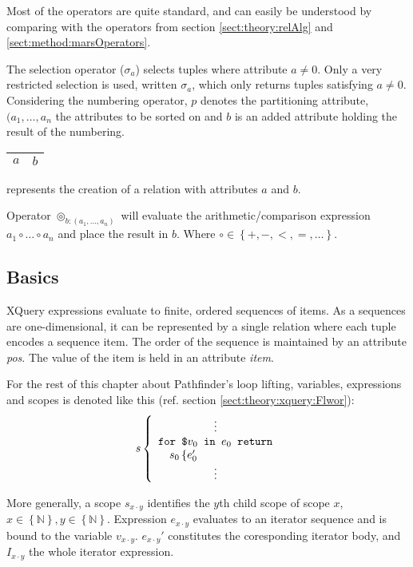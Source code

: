 Most of the operators are quite standard, and can easily be understood by comparing with the operators from
section \ref{sect:theory:relAlg} and \ref{sect:method:marsOperators}.

The selection operator ($\sigma_{a}$) selects tuples where attribute $a \ne 0$. Only a very restricted selection
is used, written $\sigma_{a}$, which only returns tuples satisfying $a \neq 0$.  Considering the numbering
operator, $p$ denotes the partitioning attribute, $(a_{1},\ldots,a_{n}$ the attributes to be sorted on and $b$ is
an added attribute holding the result of the
numbering. {\scriptsize{\begin{tabular}{c|c}$a$&$b$\\\hline\end{tabular}}}  represents the creation
of a relation with attributes $a$ and $b$.

Operator $\circledcirc_{b:(a_{1},\ldots,a_{n})}$ will evaluate the arithmetic/comparison expression $a_{1} \circ
\ldots \circ a_{n}$ and place the result in $b$. Where $\circ \in \left\{ +,- , <, =, \ldots  \right\} $.


\subsection{Basics}
\label{sect:trans:ll:Basics}
XQuery expressions evaluate to finite, ordered sequences of items. As a sequences are one-dimensional, it can be
represented by a single relation where each tuple encodes a sequence item. The order of the sequence is
maintained by an attribute \textit{pos}. The value of the item is held in an attribute \textit{item}. 

For the rest of this chapter about Pathfinder's loop lifting, variables, expressions and scopes is denoted like
this (ref. section \ref{sect:theory:xquery:Flwor}):
\[
s \left\{
\begin{array}{l}
\qquad \qquad \quad \vdots \\
\mbox{\texttt{for \$}}v_{0}\mbox{\texttt{ in }} e_{0} \mbox{\texttt{ return}} \\
\quad s_{0} \left\{ e_{0}' \right. \\
\qquad \qquad \quad \vdots
\end{array}
\right.
\]

More generally, a scope $s_{x \cdot y}$ identifies the $y$th child scope of scope $x$, $x \in \left\{
\mathbb{N}\right\}, y \in \left\{ \mathbb{N} \right\}$. Expression $e_{x\cdot y}$ evaluates to an iterator sequence
and is bound to the variable $v_{x \cdot y}$. $e_{x \cdot y}'$ constitutes the coresponding iterator body, and $I_{x \cdot y}$ the whole iterator expression.

